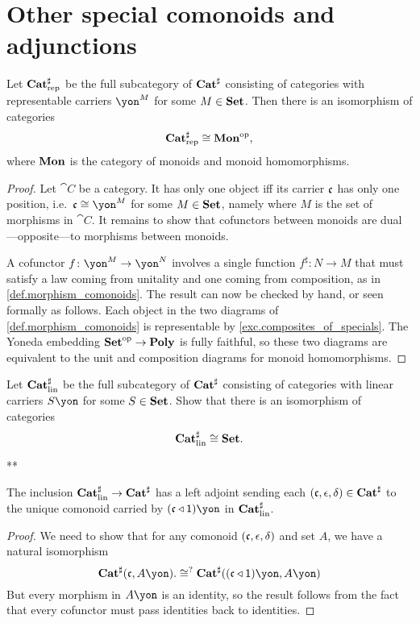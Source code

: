 \documentclass[Book-Poly]{subfiles}
\begin{document}
\section{Other special comonoids and adjunctions}

\begin{proposition}
Let $\mathbf{Cat}^\sharp_{\text{rep}}$ be the full subcategory of $\mathbf{Cat}^\sharp$ consisting of categories with representable carriers $\yon^M$ for some $M\in\mathbf{Set}$.
Then there is an isomorphism of categories
\[
    \mathbf{Cat}^\sharp_{\text{rep}}\cong\mathbf{Mon}^{\textnormal{op}},
\]
where $\mathbf{Mon}$ is the category of monoids and monoid homomorphisms.
\end{proposition}
\begin{proof}
Let $\cat{C}$ be a category. It has only one object iff its carrier $\mathfrak{c}$ has only one position, i.e.\ $\ema{c}\cong\yon^M$ for some $M\in\mathbf{Set}$, namely where $M$ is the set of morphisms in $\cat{C}$. It remains to show that cofunctors between monoids are dual---opposite---to morphisms between monoids.

A cofunctor $f\colon\yon^M\to\yon^N$ involves a single function $f^\sharp\colon N\to M$ that must satisfy a law coming from unitality and one coming from composition, as in \cref{def.morphism_comonoids}. The result can now be checked by hand, or seen formally as follows. Each object in the two diagrams of \eqref{def.morphism_comonoids} is representable by \cref{exc.composites_of_specials}. The Yoneda embedding $\mathbf{Set}^{\textnormal{op}}\to\mathbf{Poly}$ is fully faithful, so these two diagrams are equivalent to the unit and composition diagrams for monoid homomorphisms.
\end{proof}

\begin{exercise}\label{exc.lin_comon_set}
Let $\mathbf{Cat}^\sharp_{\text{lin}}$ be the full subcategory of $\mathbf{Cat}^\sharp$ consisting of categories with linear carriers $S\yon$ for some $S\in\mathbf{Set}$.
Show that there is an isomorphism of categories
\[
\mathbf{Cat}^\sharp_{\text{lin}}\cong\mathbf{Set}.
\qedhere
\]
\begin{solution}
**
\end{solution}
\end{exercise}

\begin{proposition}
The inclusion $\mathbf{Cat}^\sharp_{\text{lin}}\to\mathbf{Cat}^\sharp$ has a left adjoint sending each $(\mathfrak{c},\epsilon,\delta)\in\mathbf{Cat}^\sharp$ to the unique comonoid carried by $(\ema{c}\tri\1)\yon$ in $\mathbf{Cat}^\sharp_{\text{lin}}$.
\end{proposition}
\begin{proof}
We need to show that for any comonoid $(\mathfrak{c},\epsilon,\delta)$ and set $A$, we have a natural isomorphism
\[
  \smcat^\sharp(\ema{c},A\yon).
  \cong^?
  \smcat^\sharp((\ema{c}\tri\1)\yon,A\yon)
\]
But every morphism in $A\yon$ is an identity, so the result follows from the fact that every cofunctor must pass identities back to identities. 
\end{proof}
\end{document}
